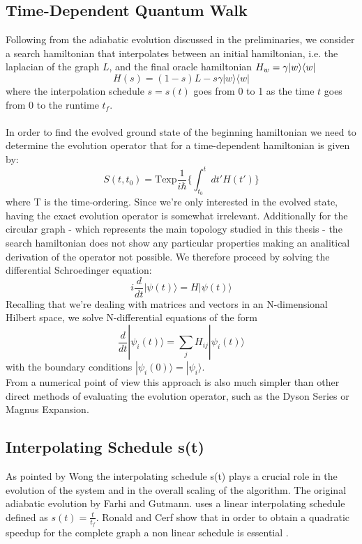     \subsection{Time-Dependent Quantum Walk}
        Following from the adiabatic evolution discussed in the preliminaries, we consider a search hamiltonian that interpolates between an initial hamiltonian, i.e. the laplacian of the graph $L$, and the final oracle hamiltonian $H_w=\gamma{|{w}\rangle}{\langle{w}|}$
          \begin{equation}
            H(s) = (1-s)L - s\gamma|w\rangle\langle w|
          \end{equation}
        where the interpolation schedule $s=s(t)$ goes from 0 to 1 as the time $t$ goes from 0 to the runtime $t_f$. \\ \\In order to find the evolved ground state of the beginning hamiltonian we need to determine the evolution operator that for a time-dependent hamiltonian is given by:
        \begin{equation}
          S(t,t_0) = \mbox{T} \mbox{exp} \frac{1}{i\hbar}\Big\{ \int_{t_0}^{t} dt' H(t')\Big\}
        \end{equation}
        where T is the time-ordering. Since we're only interested in the evolved state, having the exact evolution operator is somewhat irrelevant. Additionally for the circular graph - which represents the main topology studied in this thesis - the search hamiltonian does not show any particular properties making an analitical derivation of the operator not possible. We therefore proceed by solving the differential Schroedinger equation:
        \begin{equation}
          i\frac{d}{dt}|\psi(t)\rangle = H |\psi(t)\rangle
        \end{equation}
        Recalling that we're dealing with matrices and vectors in an N-dimensional Hilbert space, we solve N-differential equations of the form
        \begin{equation}
        \frac{d}{dt}|\psi_i(t)\rangle = \sum_jH_{ij}|\psi_i(t)\rangle
        \end{equation}
        with the boundary conditions $|\psi_i(0)\rangle = |\psi_i\rangle$.\\
        From a numerical point of view this approach is also much simpler than other direct methods of evaluating the evolution operator, such as the Dyson Series or Magnus Expansion.




    \subsection{Interpolating Schedule s(t)}
        As pointed by Wong the interpolating schedule s(t) plays a crucial role in the evolution of the system and in the overall scaling of the algorithm.
        The original adiabatic evolution by Farhi and Gutmann. \cite{Farhi2000} uses a linear interpolating schedule defined as $s(t) = \frac{t}{t_f}$. Ronald and Cerf show that in order to obtain a quadratic speedup for the complete graph a non linear schedule is essential \cite{Roland2002}\cite{Morley2018}.

